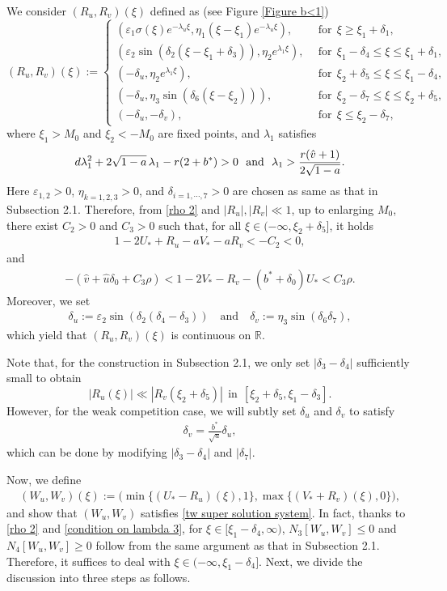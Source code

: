 \documentclass[11pt,a4paper]{article}
\numberwithin{equation}{section}
\numberwithin{figure}{section}
\newcommand\bea{\begin{eqnarray}}
\newcommand\eea{\end{eqnarray}}
\newcommand\beaa{\begin{eqnarray*}}
\newcommand\eeaa{\end{eqnarray*}}
\begin{document}
We consider $(R_u,R_v)(\xi)$ defined  as (see Figure \ref{Figure b<1})
\begin{equation*}
(R_u,R_v)(\xi):=\begin{cases}
(\varepsilon_1\sigma(\xi) e^{-\lambda_u\xi},\eta_1(\xi-\xi_1) e^{-\lambda_u\xi}),&\ \ \mbox{for}\ \ \xi\ge\xi_1+\delta_1,\\
(\varepsilon_2\sin(\delta_2(\xi-\xi_1+\delta_3)),\eta_2e^{\lambda_{1}\xi}),&\ \ \mbox{for}\ \ \xi_1-\delta_4\le\xi\le\xi_{1}+\delta_1,\\
(-\delta_u,\eta_2e^{\lambda_{1}\xi}),&\ \ \mbox{for}\ \ \xi_2+\delta_5\le\xi\le\xi_1-\delta_4,\\
(-\delta_u,\eta_3\sin(\delta_6(\xi-\xi_2))),&\ \ \mbox{for}\ \ \xi_2-\delta_7\le\xi\le\xi_2+\delta_5,\\
(-\delta_u,-\delta_v),&\ \ \mbox{for}\ \ \xi\le\xi_2-\delta_7,
\end{cases}
\end{equation*}
where $\xi_1>M_0$ and $\xi_2<-M_0$ are fixed points, and $\lambda_{1}$ satisfies
\begin{equation}\label{condition on lambda 3}
d\lambda_1^2+2\sqrt{1-a}\,\lambda_1-r(2+b^*)>0\ \ {\rm and}\ \ \lambda_1>\frac{r(\hat v+1)}{2\sqrt{1-a}}.
\end{equation}
Here
$\varepsilon_{1,2}>0$, $\eta_{k=1,2,3}>0$, and $\delta_{i=1,\cdots,7}>0$ are chosen as same as that in Subsection 2.1.  Therefore, from \eqref{rho 2} and  $|R_u|,|R_v|\ll 1$, up to enlarging $M_0$, there exist $C_2>0$ and $C_3>0$ such that, for all $\xi\in(-\infty,\xi_2+\delta_5]$, it holds
\bea\label{xi 2 weak}
1-2U_*+R_u-aV_*-aR_v<-C_2<0,
\eea
and
\bea\label{xi 2 weak 2}
-(\hat v+\hat u\delta_0+C_3\rho)<1-2V_*-R_v-(b^*+\delta_0)U_*< C_3\rho.
\eea
Moreover, we set
\bea\label{delta u v}
\delta_u:=\varepsilon_2\sin(\delta_2(\delta_4-\delta_3))\quad\text{and}\quad \delta_v:=\eta_3\sin(\delta_6\delta_7),
\eea
which yield that $(R_u,R_v)(\xi)$ is continuous on $\mathbb{R}$.

Note that, for the construction in Subsection 2.1, we only set $|\delta_3-\delta_4|$  sufficiently small to obtain 
$$|R_u(\xi)|\ll|R_v(\xi_2+\delta_5)|\ \ \text{in}\ \ [\xi_2+\delta_5,\xi_1-\delta_3].$$
 However, for the weak competition case,
we will subtly set $\delta_u$ and $\delta_v$ to satisfy
\bea\label{delta u v 1}
\delta_v=\frac{b^*}{\sqrt{a}}\delta_u,
\eea
which can be done by modifying $|\delta_3-\delta_4|$ and $|\delta_7|$.

Now, we define
\beaa
(W_u,W_v)(\xi):=\Big(\min\{(U_*-R_u)(\xi),1\},\max\{(V_*+R_v)(\xi),0\}\Big),
\eeaa
and
show that $(W_u,W_v)$
satisfies \eqref{tw super solution system}.
In fact, thanks to \eqref{rho 2} and \eqref{condition on lambda 3},
for $\xi\in[\xi_1-\delta_4,\infty)$, $N_3[W_u,W_v]\le 0$ and $N_4[W_u, W_v]\ge 0$ follow from the same argument as that in Subsection 2.1. Therefore, it suffices to  deal with $\xi\in (-\infty,\xi_1-\delta_4]$.
Next, we divide the discussion into three steps as follows.
\end{document}
